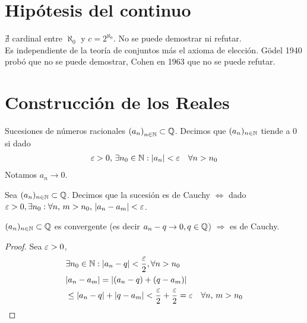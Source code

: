 \section{Hipótesis del continuo}

\( \nexists \) cardinal entre \(\aleph_0\) y \(c = 2^{\aleph_0} \). No se puede demostrar ni refutar. \\
Es independiente de la teoría de conjuntos más el axioma de elección.
Gödel 1940 probó que no se puede demostrar, Cohen en 1963 que no se puede refutar.

\section{Construcción de los Reales}

Sucesiones de números racionales \({(a_n)}_{n \in \mathbb{N}} \subset \mathbb{Q} \). Decimos que \((a_n)_{n \in \mathbb{N}} \) tiende a 0 si dado \begin{align*}
  \varepsilon > 0\text{, } \exists n_0 \in \mathbb{N} : |a_n| < \varepsilon \quad \forall n > n_0
\end{align*} Notamos \(a_n \to 0\).

\begin{definition}
  Sea \((a_n)_{n \in \mathbb{N}} \subset \mathbb{Q} \). Decimos que la sucesión es de Cauchy \(\iff \) dado \(\varepsilon > 0, \exists n_0 : \forall n\text{, }m > n_0\text{, } |a_n - a_m| < \varepsilon \).
\end{definition}

\begin{theorem}
  \((a_n)_{n \in \mathbb{N}} \subset \mathbb{Q} \) es convergente (es decir \(a_n - q \to 0, q \in \mathbb{Q} \)) \(\Rightarrow \) es de Cauchy.
  \begin{proof}
    Sea \(\varepsilon > 0\),
    \begin{align*}
       & \exists n_0 \in \mathbb{N} : |a_n - q| < \dfrac{\varepsilon}{2}, \forall n > n_0                                 \\
       & | a_n - a_m| = |(a_n - q) + (q - a_m)|                                                          \\
       & \leq |a_n - q| + |q - a_m| < \dfrac{\varepsilon}{2} + \dfrac{\varepsilon}{2} = \varepsilon \quad \forall n\text{, }m > n_0
    \end{align*}
  \end{proof}
\end{theorem}

